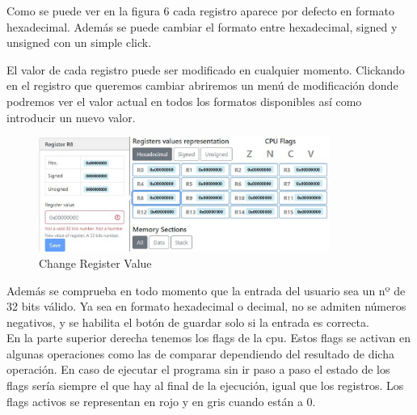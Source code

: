 {{            Como se puede ver en la figura 6 cada registro aparece por defecto en formato hexadecimal.
            Además se puede cambiar el formato entre hexadecimal, signed y unsigned con un simple click.

            El valor de cada registro puede ser modificado en cualquier momento. Clickando en el registro
            que queremos cambiar abriremos un menú de modificación donde podremos ver el valor actual en
            todos los formatos disponibles así como introducir un nuevo valor.

            \begin{figure}[h]
                \centering
                \includegraphics[width=0.85\textwidth]{images/modifyregister}
                \caption{Change Register Value}
            \end{figure}

            Además se comprueba en todo momento que la entrada del usuario sea un nº de 32 bits válido.
            Ya sea en formato hexadecimal o decimal, no se admiten números negativos, y se habilita el botón
            de guardar solo si la entrada es correcta. \\

            En la parte superior derecha tenemos los flags de la cpu. Estos flags se activan en algunas operaciones
            como las de comparar dependiendo del resultado de dicha operación. En caso de ejecutar el programa sin ir
            paso a paso el estado de los flags sería siempre el que hay al final de la ejecución, 
            igual que los registros. Los flags activos se representan en rojo y en gris cuando están a 0.
            \clearpage


        }

}
